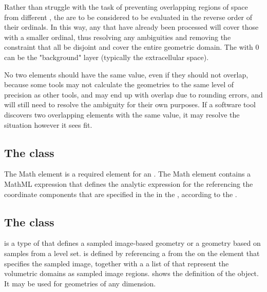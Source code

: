 Rather than struggle with the task of preventing overlapping regions of space from different \AnalyticVolumes, the \AnalyticVolumes are to be considered to be evaluated in the reverse order of their ordinals.  In this way, any \AnalyticVolumes that have already been processed will cover those with a smaller ordinal, thus resolving any ambiguities and removing the constraint that all \AnalyticVolumes be disjoint and cover the entire geometric domain.  The \AnalyticVolume with  0 can be the "background" layer (typically the extracellular space).  

No two \AnalyticVolume elements should have the same  value, even if they should not overlap, because some tools may not calculate the geometries to the same level of precision as other tools, and may end up with overlap due to rounding errors, and will still need to resolve the ambiguity for their own purposes.  If a software tool discovers two overlapping \AnalyticVolume elements with the same  value, it may resolve the situation however it sees fit.


\subsection{The  class}
\label{math-class}
The Math element is a required element for an \AnalyticVolume. The Math element contains a MathML expression that defines the analytic expression for the \AnalyticVolume referencing the coordinate components that are specified in the \ListOfCoordinateComponents in the \Geometry, according to the . 


\subsection{The  class}
\label{sampledfieldgeometry-class}
\label{listofsampledvolumes-class}
\SampledFieldGeometry is a type of \GeometryDefinition that defines a sampled image-based geometry or a geometry based on samples from a level set. \SampledFieldGeometry is defined by referencing a \SampledField from the \ListOfSampledFields on the \Geometry element that specifies the sampled image, together with a a list of \SampledVolumes that represent the volumetric domains as sampled image regions.  shows the definition of the \SampledFieldGeometry object.  It may be used for geometries of any dimension.

